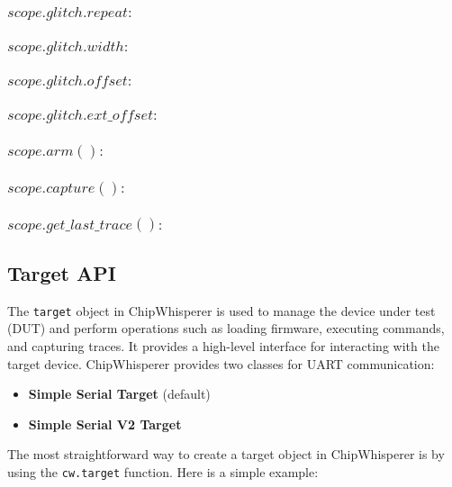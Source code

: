 \subsubsection{$scope.glitch.repeat :$}

\subsubsection{$scope.glitch.width :$}

\subsubsection{$scope.glitch.offset :$}

\subsubsection{$scope.glitch.ext\_offset :$}

\subsubsection{$scope.arm() :$}

\subsubsection{$scope.capture() :$}

\subsubsection{$scope.get\_last\_trace() :$}



\subsection{Target API}
The \texttt{target} object in ChipWhisperer is used to manage the device under test (DUT) and perform operations such as loading firmware, executing commands, and capturing traces. It provides a high-level interface for interacting with the target device.
ChipWhisperer provides two classes for UART communication:

\begin{itemize}
    \item \textbf{Simple Serial Target} (default)
    \item \textbf{Simple Serial V2 Target}
\end{itemize}

The most straightforward way to create a target object in ChipWhisperer is by using the \texttt{cw.target} function. Here is a simple example:

